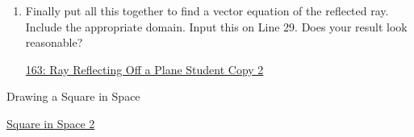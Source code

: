 \documentclass{ximera}
\begin{document}
\begin{question}
\begin{enumerate}


\item Finally put all this together to find a vector equation of the reflected ray. Include the appropriate domain. Input this on Line 29. Does your result look reasonable?


\begin{onlineOnly}
    \begin{center}
\end{center}
\end{onlineOnly}

\href{https://www.desmos.com/3d/znxtexpsnt}{163: Ray Reflecting Off a Plane Student Copy 2}




\end{enumerate}

\end{question}



Drawing a Square in Space

\href{https://www.desmos.com/3d/3a19b63ef0}{Square in Space 2}
\end{document}
